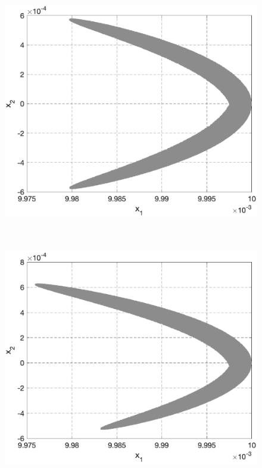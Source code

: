 \documentclass[../main.tex]{subfiles}
\begin{document}
	\begin{figure}[ht!] 
		\hspace{-2.5ex}
		\begin{minipage}[b]{.49\linewidth} 
			\small
			\centering 
			\includegraphics[width=\linewidth]{images/OsipovI_u=0_x1-x2.eps}
			\label{fig:u=0_x1-x2} 
		\end{minipage}
		\hfill
		\begin{minipage}[b]{.49\linewidth} 
			\small
			\centering
			\includegraphics[width=\linewidth]{images/OsipovI_u=1_x1-x2.eps}

\end{minipage}
\end{figure}
\end{document}
